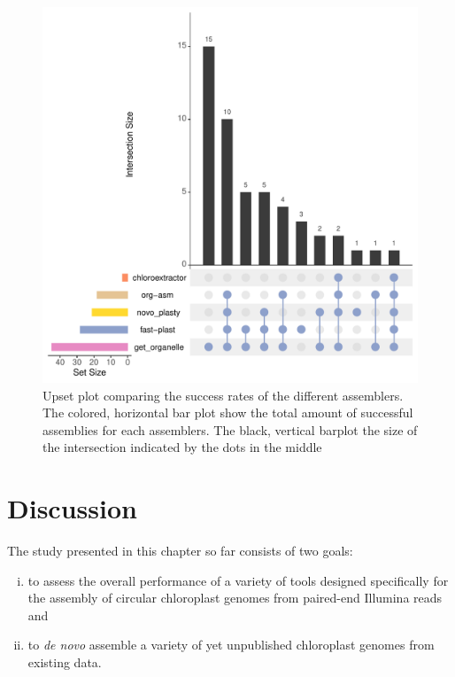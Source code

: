 \begin{figure}[H]
\centering
\includegraphics[height=.45\textheight, width=.95\textwidth]{Figures/upset_novel}
\decoRule
\caption[Upset plot comparing the success rates for novel data sets]{Upset plot comparing
  the success rates of the different assemblers. The colored, horizontal bar plot show the
  total amount of successful assemblies for each assemblers. The black, vertical barplot
  the size of the intersection indicated by the dots in the middle}
\label{fig:upset_novel}
\end{figure}

\section{Discussion} \label{dis_cp}

The study presented in this chapter so far consists of two goals:
\begin{enumerate}[(i)]
\item to assess the overall performance of a variety of tools designed specifically for
  the assembly of circular chloroplast genomes from paired-end Illumina reads and
\item to \textit{de novo} assemble a variety of yet unpublished chloroplast genomes from existing data.
\end{enumerate}

